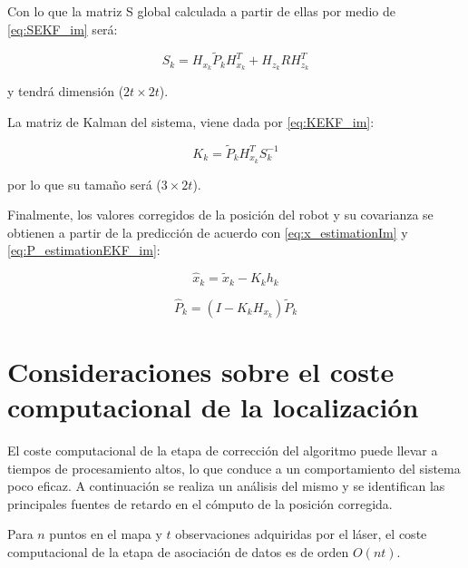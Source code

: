 




Con lo que la matriz S global calculada a partir de ellas por medio de \ref{eq:SEKF_im} será:

\begin{equation}\label{eq:S_robot}
    S_{k} = H_{x_{k}}\tilde{P}_{k}H_{x_{k}}^{T}+H_{z_{k}}RH_{z_{k}}^{T}
\end{equation}

y tendrá dimensión ($2t \times 2t$).

La matriz de Kalman del sistema, viene dada por \ref{eq:KEKF_im}:

\begin{equation}\label{eq:K_robot}
    K_{k} = \tilde{P}_{k}H_{x_{k}}^{T}S_{k}^{-1}
\end{equation}

por lo que su tamaño será ($3 \times 2t$).

Finalmente, los valores corregidos de la posición del robot y su covarianza se obtienen a partir de la predicción de acuerdo con \ref{eq:x_estimationIm} y \ref{eq:P_estimationEKF_im}:

\begin{equation}\label{eq:x_robot}
    \hat{x}_{k} = \tilde{x}_{k} - K_{k}h_{k}
\end{equation}

\begin{equation}\label{eq:P_robot}
    \hat{P}_{k} = (I-K_{k}H_{x_{k}})\tilde{P}_{k}
\end{equation}


\section{Consideraciones sobre el coste computacional de la localización} \label{computacional}

El coste computacional de la etapa de corrección del algoritmo puede llevar a tiempos de procesamiento altos, lo que conduce a un comportamiento del sistema poco eficaz. A continuación se realiza un análisis del mismo y se identifican las principales fuentes de retardo en el cómputo de la posición corregida.

Para $n$ puntos en el mapa y $t$ observaciones adquiridas por el láser, el coste computacional de la etapa de asociación de datos es de orden $O(nt)$.

